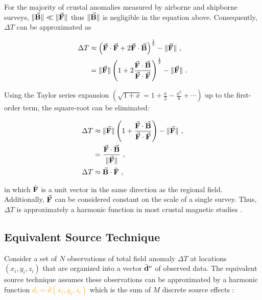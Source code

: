 \noindent
For the majority of crustal anomalies measured by airborne and shipborne surveys, $\lVert \vec{\mathbf{B}} \rVert \ll \lVert \vec{\mathbf{F}} \rVert$ thus $\lVert \vec{\mathbf{B}} \rVert$ is negligible in the equation above. Consequently, $\Delta T$ can be approximated as \citep{Blakley1995}

\begin{align}
    \Delta T &\approx \left(
        \vec{\mathbf{F}} \cdot \vec{\mathbf{F}} 
        + 2\vec{\mathbf{F}} \cdot \vec{\mathbf{B}}
    \right)^{\frac{1}{2}} 
    - \lVert \vec{\mathbf{F}} \rVert \ ,
    \\
    &= \lVert \vec{\mathbf{F}} \rVert \left(
        1 + 2 \dfrac{
            \vec{\mathbf{F}} \cdot \vec{\mathbf{B}}
        }{
            \vec{\mathbf{F}} \cdot \vec{\mathbf{F}}
        }
    \right)^{\frac{1}{2}} 
    - \lVert \vec{\mathbf{F}} \rVert \ .
    \label{eq:}
\end{align}

\noindent
Using the Taylor series expansion $\left( \sqrt{1 + x} = 1 + \frac{x}{2} - \frac{x^2}{8} + \cdots \right)$ up to the first-order term, the square-root can be eliminated:

\begin{align}
    \Delta T & \approx \lVert \vec{\mathbf{F}} \rVert \left(
        1 + \dfrac{
            \vec{\mathbf{F}} \cdot \vec{\mathbf{B}}
        }{
            \vec{\mathbf{F}} \cdot \vec{\mathbf{F}}
        }
    \right) 
    - \lVert \vec{\mathbf{F}} \rVert \ ,
    \\
    &=
    \dfrac{\vec{\mathbf{F}} \cdot \vec{\mathbf{B}}}{\lVert \vec{\mathbf{F}} \rVert} \ ,
    \\
\label{eq:tfa_dot_product}
    \Delta T & \approx \vec{\mathbf{B}} \cdot \hat{\mathbf{F}}
    \ ,
\end{align}

\noindent
in which $\hat{\mathbf{F}}$ is a unit vector in the same direction as the regional field. Additionally, $\vec{\mathbf{F}}$ can be considered constant on the scale of a single survey. Thus, $\Delta T$ is approximately a harmonic function in most crustal magnetic studies \citep{Blakley1995,OliveiraJr2015}.


\subsection{Equivalent Source Technique}

Consider a set of $N$ observations of total field anomaly $\Delta T$ at locations $(x_i, y_i, z_i)$ that are organized into a vector $\bar{\mathbf{d}}^o$ of observed data.
The equivalent source technique assumes these observations can be approximated by a harmonic function \textcolor{orange}{$d_i = d(x_i, y_i, z_i)$} which is the sum of $M$ discrete source effects \citep{Dampney1969, Cordell1992}:

